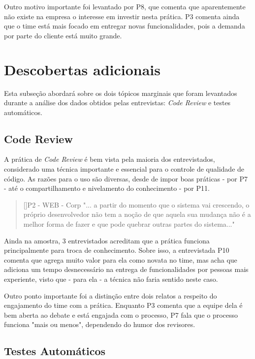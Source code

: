 Outro motivo importante foi levantado por P8, que comenta que aparentemente não existe na empresa o interesse em investir nesta prática. P3 comenta ainda que o time está mais focado em entregar novas funcionalidades, pois a demanda por parte do cliente está muito grande.

\section{Descobertas adicionais}

Esta subseção abordará sobre os dois tópicos marginais que foram levantados durante a análise dos dados obtidos pelas entrevistas: \emph{Code Review} e testes automáticos.

\subsection{Code Review}

A prática de \emph{Code Review} é bem vista pela maioria dos entrevistados, considerado uma técnica importante e essencial para o controle de qualidade de código. As razões para o uso são diversas, desde de impor boas práticas - por P7 - até o compartilhamento e nivelamento do conhecimento - por P11.

\begin{quotation}[]{P2 - WEB - Corp}
    "... a partir do momento que o sistema vai crescendo, o próprio desenvolvedor não tem a noção de que aquela sua mudança não é a melhor forma de fazer e que pode quebrar outras partes do sistema..."
\end{quotation}

Ainda na amostra, 3 entrevistados acreditam que a prática funciona principalmente para troca de conhecimento. Sobre isso, a entrevistada P10 comenta que agrega muito valor para ela como novata no time, mas acha que adiciona um tempo desnecessário na entrega de funcionalidades por pessoas mais experiente, visto que - para ela - a técnica não faria sentido neste caso.

Outro ponto importante foi a distinção entre dois relatos a respeito do engajamento do time com a prática. Enquanto P3 comenta que a equipe dela é bem aberta ao debate e está engajada com o processo, P7 fala que o processo funciona "mais ou menos", dependendo do humor dos revisores.

\subsection{Testes Automáticos}

